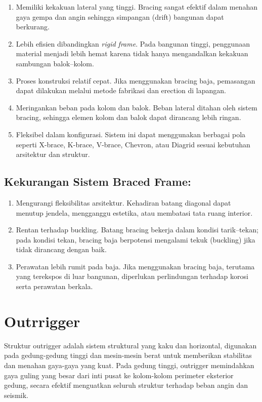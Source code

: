 \documentclass[../modul_skb.tex]{subfiles}
\begin{document}
\begin{enumerate}
	\item Memiliki kekakuan lateral yang tinggi. Bracing sangat efektif dalam menahan gaya gempa dan angin sehingga simpangan (drift) bangunan dapat berkurang.
	\item Lebih efisien dibandingkan \textit{rigid frame}. Pada bangunan tinggi, penggunaan material menjadi lebih hemat karena tidak hanya mengandalkan kekakuan sambungan balok–kolom.
	\item Proses konstruksi relatif cepat. Jika menggunakan bracing baja, pemasangan dapat dilakukan melalui metode fabrikasi dan erection di lapangan.
	\item Meringankan beban pada kolom dan balok. Beban lateral ditahan oleh sistem bracing, sehingga elemen kolom dan balok dapat dirancang lebih ringan.
	\item Fleksibel dalam konfigurasi. Sistem ini dapat menggunakan berbagai pola seperti X-brace, K-brace, V-brace, Chevron, atau Diagrid sesuai kebutuhan arsitektur dan struktur.
\end{enumerate}

\subsection{Kekurangan Sistem Braced Frame:}%
\label{sub:Kekurangan Sistem Braced Frame:}

\begin{enumerate}
	\item Mengurangi fleksibilitas arsitektur. Kehadiran batang diagonal dapat menutup jendela, mengganggu estetika, atau membatasi tata ruang interior.
	\item Rentan terhadap buckling. Batang bracing bekerja dalam kondisi tarik–tekan; pada kondisi tekan, bracing baja berpotensi mengalami tekuk (buckling) jika tidak dirancang dengan baik.
	\item Perawatan lebih rumit pada baja. Jika menggunakan bracing baja, terutama yang terekspos di luar bangunan, diperlukan perlindungan terhadap korosi serta perawatan berkala.
\end{enumerate}

\section{Outrrigger}%
\label{sec:Outrrigger}

Struktur outrigger adalah sistem struktural yang kaku dan horizontal, digunakan pada gedung-gedung tinggi dan mesin-mesin berat untuk memberikan stabilitas dan menahan gaya-gaya yang kuat. Pada gedung tinggi, outrigger memindahkan gaya guling yang besar dari inti pusat ke kolom-kolom perimeter eksterior gedung, secara efektif menguatkan seluruh struktur terhadap beban angin dan seismik.
\end{document}
